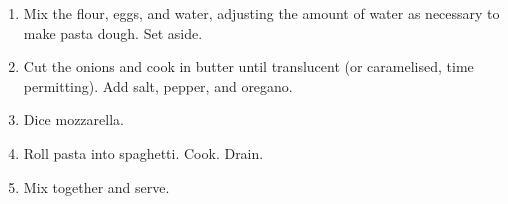 
\begin{ingredients}
\end{ingredients}


\begin{recipe}
  \begin{enumerate}

  \item Mix the flour, eggs, and water, adjusting the amount of water
    as necessary to make pasta dough.  Set aside.

  \item Cut the onions and cook in butter until translucent (or
    caramelised, time permitting).  Add salt, pepper, and oregano.

  \item Dice mozzarella.

  \item Roll pasta into spaghetti.  Cook.  Drain.

  \item Mix together and serve.

  \end{enumerate}
\end{recipe}

